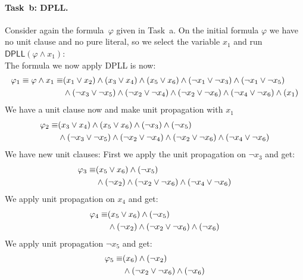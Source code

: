 
\paragraph{Task~b: DPLL.}
Consider again the formula~$\varphi$ given in Task~a.
%
On the initial formula $\varphi$ we have no unit clause and no pure literal, so we select the variable $x_1$ and run $\textsf{DPLL}(\varphi \land x_1)$: \\
The formula we now apply \textsf{DPLL} is now:
\begin{align*}
\varphi_1 \equiv \varphi \land x_1 \equiv & (x_1 \lor x_2) \land
  (x_3 \lor x_4) \land
  (x_5 \lor x_6) \land
  (\neg x_1 \lor \neg x_3) \land
  (\neg x_1 \lor \neg x_5) \\ & \land
  (\neg x_3 \lor \neg x_5) \land
  (\neg x_2 \lor \neg x_4) \land
  (\neg x_2 \lor \neg x_6) \land
  (\neg x_4 \lor \neg x_6) \land (x_1)
\end{align*}
We have a unit clause now and make unit propagation with $x_1$
\begin{align*}
\varphi_2 \equiv &
  (x_3 \lor x_4) \land
  (x_5 \lor x_6) \land
  (\neg x_3) \land
  (\neg x_5) \\ & \land
  (\neg x_3 \lor \neg x_5) \land
  (\neg x_2 \lor \neg x_4) \land
  (\neg x_2 \lor \neg x_6) \land
  (\neg x_4 \lor \neg x_6)
\end{align*}
We have new unit clauses: First we apply the unit propagation on $\neg x_3$ and get:
\begin{align*}
 \varphi_3 \equiv &
   (x_5 \lor x_6) \land
   (\neg x_5) \\ & \land
   (\neg x_2) \land
   (\neg x_2 \lor \neg x_6) \land
   (\neg x_4 \lor \neg x_6)
\end{align*}
We apply unit propagation on $x_4$ and get:
\begin{align*}
 \varphi_4 \equiv &
   (x_5 \lor x_6) \land
   (\neg x_5) \\ & \land
   (\neg x_2) \land
   (\neg x_2 \lor \neg x_6) \land
   (\neg x_6)
\end{align*}
We apply unit propagation $\neg x_5$ and get:
\begin{align*}
 \varphi_5 \equiv &
   (x_6) \land
   (\neg x_2) \\ & \land
   (\neg x_2 \lor \neg x_6) \land
   (\neg x_6)
\end{align*}
